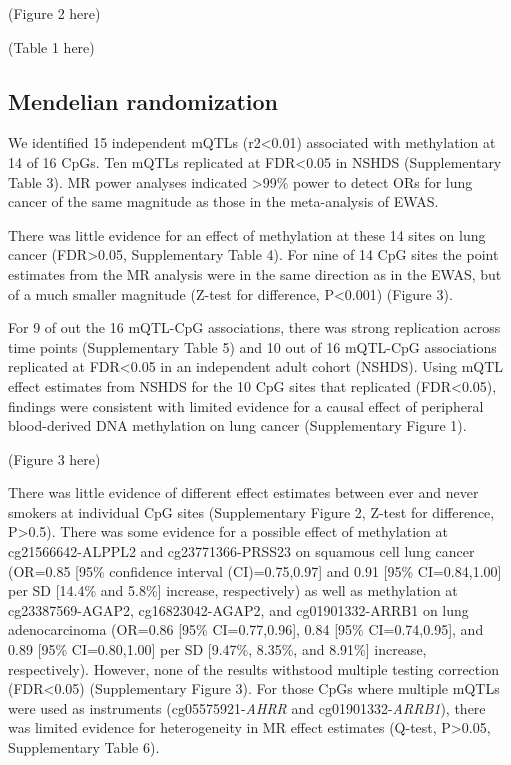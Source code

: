\documentclass[11pt,oneside]{bristolthesis}
\begin{document}
(Figure 2 here)

(Table 1 here)

\hypertarget{results-mendelian-randomization-07}{%
\subsection{Mendelian randomization}\label{results-mendelian-randomization-07}}

We identified 15 independent mQTLs (r2\textless0.01) associated with methylation at 14 of 16 CpGs. Ten mQTLs replicated at FDR\textless0.05 in NSHDS (Supplementary Table 3). MR power analyses indicated \textgreater99\% power to detect ORs for lung cancer of the same magnitude as those in the meta-analysis of EWAS.

There was little evidence for an effect of methylation at these 14 sites on lung cancer (FDR\textgreater0.05, Supplementary Table 4). For nine of 14 CpG sites the point estimates from the MR analysis were in the same direction as in the EWAS, but of a much smaller magnitude (Z-test for difference, P\textless0.001) (Figure 3).

For 9 of out the 16 mQTL-CpG associations, there was strong replication across time points (Supplementary Table 5) and 10 out of 16 mQTL-CpG associations replicated at FDR\textless0.05 in an independent adult cohort (NSHDS). Using mQTL effect estimates from NSHDS for the 10 CpG sites that replicated (FDR\textless0.05), findings were consistent with limited evidence for a causal effect of peripheral blood-derived DNA methylation on lung cancer (Supplementary Figure 1).

(Figure 3 here)

There was little evidence of different effect estimates between ever and never smokers at individual CpG sites (Supplementary Figure 2, Z-test for difference, P\textgreater0.5). There was some evidence for a possible effect of methylation at cg21566642-ALPPL2 and cg23771366-PRSS23 on squamous cell lung cancer (OR=0.85 {[}95\% confidence interval (CI)=0.75,0.97{]} and 0.91 {[}95\% CI=0.84,1.00{]} per SD {[}14.4\% and 5.8\%{]} increase, respectively) as well as methylation at cg23387569-AGAP2, cg16823042-AGAP2, and cg01901332-ARRB1 on lung adenocarcinoma (OR=0.86 {[}95\% CI=0.77,0.96{]}, 0.84 {[}95\% CI=0.74,0.95{]}, and 0.89 {[}95\% CI=0.80,1.00{]} per SD {[}9.47\%, 8.35\%, and 8.91\%{]} increase, respectively). However, none of the results withstood multiple testing correction (FDR\textless0.05) (Supplementary Figure 3). For those CpGs where multiple mQTLs were used as instruments (cg05575921-\emph{AHRR} and cg01901332-\emph{ARRB1}), there was limited evidence for heterogeneity in MR effect estimates (Q-test, P\textgreater0.05, Supplementary Table 6).
\end{document}
